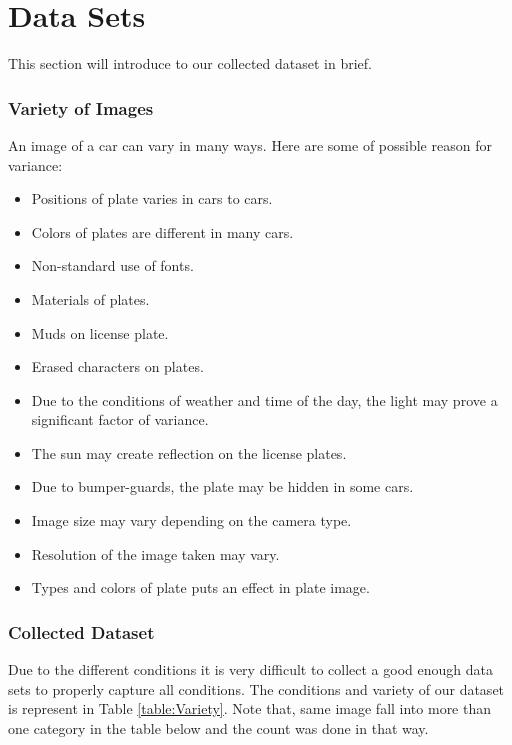 \documentclass{standalone}
\begin{document}
\chapter{Data Sets}
This section will introduce to our collected dataset in brief. 

\subsection{Variety of Images}
An image of a car can vary in many ways. Here are some of possible reason for variance:
\begin{itemize}
    \item Positions of plate varies in cars to cars.
    \item Colors of plates are different in many cars.
    \item Non-standard use of fonts.
    \item Materials of plates.
    \item Muds on license plate.
    \item Erased characters on plates.
    \item Due to the conditions of weather and time of the day, the light may prove a significant factor of variance. 
    \item The sun may create reflection on the license plates.
    \item Due to bumper-guards, the plate may be hidden in some cars.
    \item Image size may vary depending on the camera type.
    \item Resolution of the image taken may vary.
    \item Types and colors of plate puts an effect in plate image.
\end{itemize}

\subsection{Collected Dataset}
Due to the different conditions it is very difficult to collect a good enough data sets to properly capture all conditions. The conditions and variety of our dataset is represent in Table \ref{table:Variety}. Note that, same image fall into more than one category in the table below and the count was done in that way. 
\end{document}
